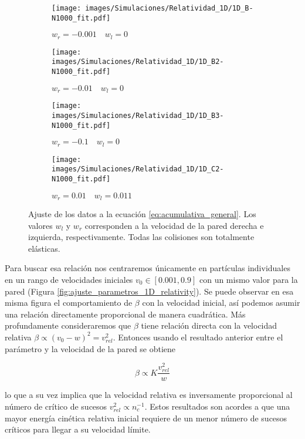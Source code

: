 \documentclass[11pt, spanish]{book}
\newcommand{\cambios}[1]{\textcolor{green!70!black}{#1}}
\begin{document}
\begin{figure}[h]
    \begin{subfigure}[b]{0.5\textwidth}
        \centering
        \texttt{[image: images/Simulaciones/Relatividad\_1D/1D\_B-N1000\_fit.pdf]}
        \caption{$w_r = -0.001 \quad w_l = 0$}
    \end{subfigure}
    \hfill
    \begin{subfigure}[b]{0.5\textwidth}
        \centering
        \texttt{[image: images/Simulaciones/Relatividad\_1D/1D\_B2-N1000\_fit.pdf]}
        \caption{$w_r = -0.01 \quad w_l = 0$}
    \end{subfigure}
    \hfill
    \begin{subfigure}[b]{0.5\textwidth}
        \centering
        \texttt{[image: images/Simulaciones/Relatividad\_1D/1D\_B3-N1000\_fit.pdf]}
        \caption{$w_r = -0.1 \quad w_l = 0$}
    \end{subfigure}
    \hfill
    \begin{subfigure}[b]{0.5\textwidth}
        \centering
        \texttt{[image: images/Simulaciones/Relatividad\_1D/1D\_C2-N1000\_fit.pdf]}
        \caption{$w_r = 0.01 \quad w_l = 0.011$}
    \end{subfigure}
    \caption{Ajuste de los datos a la ecuación \ref{eq:acumulativa_general}. Los valores \( w_l \) y \( w_r \) corresponden a la velocidad de la pared derecha e izquierda, respectivamente. Todas las colisiones son totalmente elásticas.}
    \label{fig:ajuste_1D_relativity}
\end{figure}

Para buscar esa relación nos centraremos únicamente en partículas individuales en un rango de velocidades iniciales \( v_0 \in [0.001, 0.9] \) con un mismo valor para la pared (Figura \ref{fig:ajuste_parametros_1D_relativity}). \cambios{Se puede observar en esa misma figura el comportamiento de \( \beta \) con la velocidad inicial, así podemos asumir una relación directamente proporcional de manera cuadrática. Más profundamente consideraremos que \( \beta \) tiene relación directa con la velocidad relativa \( \beta \propto (v_0 - w)^2 = v_{rel}^2\). Entonces usando el resultado anterior entre el parámetro y la velocidad de la pared se obtiene}

\begin{equation}
    \beta \propto K \dfrac{v^2_{rel}}{w}
\end{equation}

\cambios{lo que a su vez implica que la velocidad relativa es inversamente proporcional al número de crítico de sucesos \( v^2_{rel} \propto n_c^{-1} \). Estos resultados son acordes a que una mayor energía cinética relativa inicial requiere de un menor número de sucesos críticos para llegar a su velocidad límite.}
\end{document}
